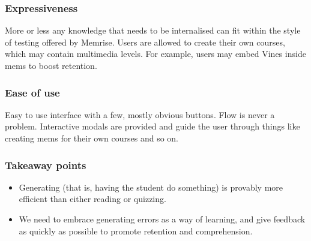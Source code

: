 \subsubsection{Expressiveness}

More or less any knowledge that needs to be internalised can fit within the
style of testing offered by Memrise. Users are allowed to create their own
courses, which may contain multimedia levels. For example, users may embed Vines
inside mems to boost retention. 

\subsubsection{Ease of use}

Easy to use interface with a few, mostly obvious buttons. Flow is never a 
problem. Interactive modals are provided and guide the user through things 
like creating mems for their own courses and so on.

\subsubsection{Takeaway points}

\begin{itemize}
\item Generating (that is, having the student do something) is provably more
  efficient than either reading or quizzing.
\item We need to embrace generating errors as a way of learning, and give feedback
  as quickly as possible to promote retention and comprehension.
\end{itemize}

